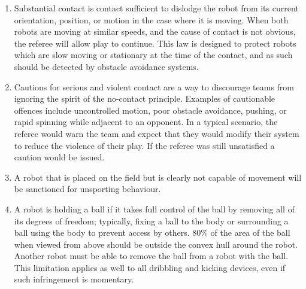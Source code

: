 \begin{enumerate}
\item
Substantial contact is contact sufficient to dislodge the robot from its current orientation, position, or motion in the case where it is moving.
When both robots are moving at similar speeds, and the cause of contact is not obvious, the referee will allow play to continue.
This law is designed to protect robots which are slow moving or stationary at the time of the contact, and as such should be detected by obstacle avoidance systems.

\item
Cautions for serious and violent contact are a way to discourage teams from ignoring the spirit of the no-contact principle.
Examples of cautionable offences include uncontrolled motion, poor obstacle avoidance, pushing, or rapid spinning while adjacent to an opponent.
In a typical scenario, the referee would warn the team and expect that they would modify their system to reduce the violence of their play.
If the referee was still unsatisfied a caution would be issued.

\item
A robot that is placed on the field but is clearly not capable of movement will be sanctioned for unsporting behaviour.

\item
A robot is holding a ball if it takes full control of the ball by removing all of its degrees of freedom; typically, fixing a ball to the body or surrounding a ball using the body to prevent access by others.
80\% of the area of the ball when viewed from above should be outside the convex hull around the robot.
Another robot must be able to remove the ball from a robot with the ball.
This limitation applies as well to all dribbling and kicking devices, even if such infringement is momentary.


\end{enumerate}
